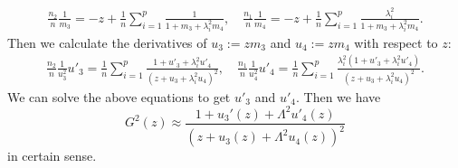 \begin{align}\label{m34shift}
\frac{n_2}{n}\frac1{m_3} = - z +\frac1n\sum_{i=1}^p \frac1{  1+m_3 + \lambda_i^2m_4  } ,\quad \frac{n_1}{n}\frac1{m_4} = - z +\frac1n\sum_{i=1}^p \frac{\lambda_i^2 }{  1+m_3 + \lambda_i^2m_4  } .
\end{align}
Then we calculate the derivatives of $u_3:=zm_3$ and $u_4:=zm_4$ with respect to $z$:
\begin{align}\label{dotm34}
\frac{n_2}{n}\frac1{u_3^2}u'_3 =  \frac1n\sum_{i=1}^p \frac{1+u'_3 + \lambda_i^2 u'_4}{ ( z+u_3 + \lambda_i^2u_4)^2  } ,\quad \frac{n_1}{n}\frac1{u_4^2}u'_4 =   \frac1n\sum_{i=1}^p \frac{\lambda_i^2\left(1+u'_3 + \lambda_i^2 u'_4\right) }{  (z+u_3 + \lambda_i^2u_4)^2  } .
\end{align}
We can solve the above equations to get $u'_3$ and $u'_4$. Then we have 
$$ G^2(z) \approx   \frac{1 +  u_3'(z) +\Lambda^2 u'_4(z)}{ \left( z+ u_3(z) + \Lambda^2  u_4(z)\right)^2}  $$
{\cob in certain sense}.


